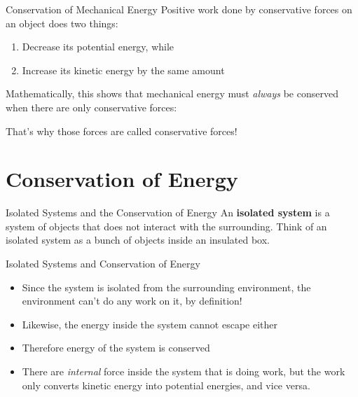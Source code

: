 \documentclass[12pt,compress,aspectratio=169]{beamer}
\newcommand{\eq}[2]{\vspace{#1}{\Large\begin{displaymath}#2\end{displaymath}}}
\begin{document}
\begin{frame}{Conservation of Mechanical Energy}
  Positive work done by conservative forces on an object does two things:
  \begin{enumerate}[1.]
  \item Decrease its potential energy, while
  \item Increase its kinetic energy by the same amount
  \end{enumerate}
  Mathematically, this shows that mechanical energy must \emph{always} be
  conserved when there are only conservative forces:

  \eq{-.15in}{
    W_c=-\Delta U = \Delta K \quad\longrightarrow\quad
    \Delta K + \Delta U =0
  }

  That's why those forces are called conservative forces!
\end{frame}



\section{Conservation of Energy}

\begin{frame}{Isolated Systems and the Conservation of Energy}
  An \textbf{isolated system} is a system of objects that does not interact with
  the surrounding. Think of an isolated system as a bunch of objects inside an
  insulated box.
  \begin{center}
  \end{center}
\end{frame}


\begin{frame}{Isolated Systems and Conservation of Energy}
  \begin{itemize}
  \item Since the system is isolated from the surrounding environment, the
    environment can't do any work on it, by definition!
  \item Likewise, the energy inside the system cannot escape either
  \item Therefore energy of the system is conserved
  \item There are \emph{internal} force inside the system that is doing work,
    but the work only converts kinetic energy into potential energies, and vice
    versa.
  \end{itemize}
\end{frame}
\end{document}
